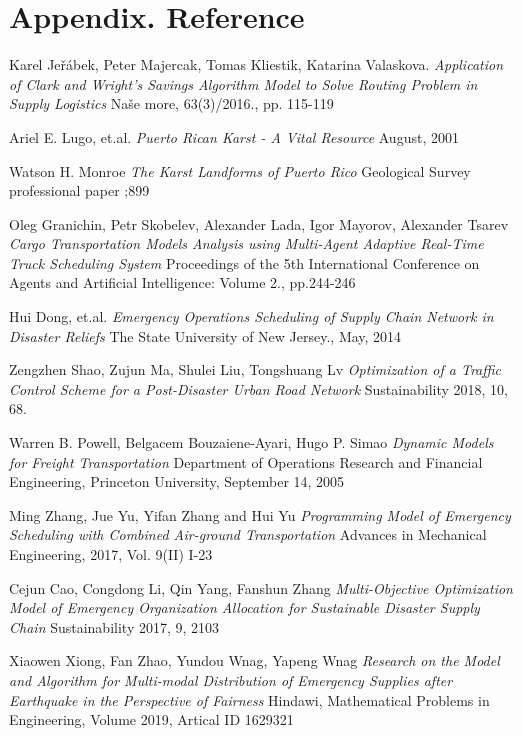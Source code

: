 \documentclass[12pt]{article}
\begin{document}
	\section{Appendix. Reference}
	\begin{thebibliography}{10}
		Karel Jeřábek, Peter Majercak, Tomas Kliestik, Katarina Valaskova.
		\textit{Application of Clark and Wright's Savings Algorithm Model to Solve Routing Problem in Supply Logistics}
		Naše more, 63(3)/2016., pp. 115-119
		
		Ariel E. Lugo, et.al. 
		\textit{Puerto Rican Karst - A Vital Resource}
		August, 2001
		
		Watson H. Monroe
		\textit{The Karst Landforms of Puerto Rico}
		Geological Survey professional paper ;899
		
		Oleg Granichin, Petr Skobelev, Alexander Lada, Igor Mayorov, Alexander Tsarev
		\textit{Cargo Transportation Models Analysis using Multi-Agent Adaptive Real-Time Truck Scheduling System}
		Proceedings of the 5th International Conference on Agents and Artificial Intelligence: Volume 2., pp.244-246
		
		Hui Dong, et.al.
		\textit{Emergency Operations Scheduling of Supply Chain Network in Disaster Reliefs}
		The State University of New Jersey., May, 2014
		
		Zengzhen Shao, Zujun Ma, Shulei Liu, Tongshuang Lv
		\textit{Optimization of a Traffic Control Scheme for a Post-Disaster Urban Road Network}
		Sustainability 2018, 10, 68.
		
		Warren B. Powell, Belgacem Bouzaiene-Ayari, Hugo P. Simao
		\textit{Dynamic Models for Freight Transportation}
		Department of Operations Research and Financial Engineering, Princeton University, September 14, 2005
		
		Ming Zhang, Jue Yu, Yifan Zhang and Hui Yu
		\textit{Programming Model of Emergency Scheduling with Combined Air-ground Transportation}
		Advances in Mechanical Engineering, 2017, Vol. 9(II) I-23
		
		Cejun Cao, Congdong Li, Qin Yang, Fanshun Zhang
		\textit{Multi-Objective Optimization Model of Emergency Organization Allocation for Sustainable Disaster Supply Chain}
		Sustainability 2017, 9, 2103
		
		Xiaowen Xiong, Fan Zhao, Yundou Wnag, Yapeng Wnag
		\textit{Research on the Model and Algorithm for Multi-modal Distribution of Emergency Supplies after Earthquake in the Perspective of Fairness}
		Hindawi, Mathematical Problems in Engineering, Volume 2019, Artical ID 1629321
		
	\end{thebibliography}
\end{document}
